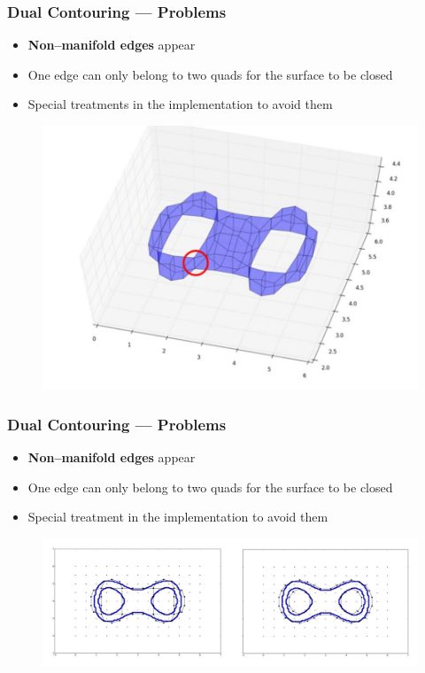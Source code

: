 \begin{frame}

	\frametitle{Dual Contouring --- Problems}
	
	\begin{itemize}
	\item  \textbf{Non--manifold edges} appear
	\item One edge can only belong to two quads for the surface to be closed
	\item Special treatments in the implementation to avoid them
	\end{itemize}
	\begin{figure}
	\includegraphics[scale=0.35]{Pictures/DC/manifolds.pdf}
	\end{figure}
	
\end{frame}

\begin{frame}

	\frametitle{Dual Contouring --- Problems}
	
	\begin{itemize}
	\item  \textbf{Non--manifold edges} appear
	\item One edge can only belong to two quads for the surface to be closed
	\item Special treatment in the implementation to avoid them
	\end{itemize}
	\begin{figure}
	\includegraphics[scale=0.35]{Pictures/DC/DC_3.pdf}
	\end{figure}
	
\end{frame}

